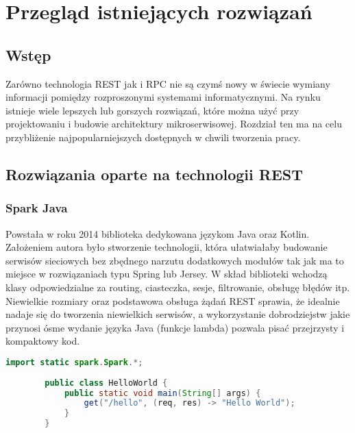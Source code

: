 \chapter{Przegląd istniejących rozwiązań}
\section{Wstęp}
Zarówno technologia REST jak i RPC nie są czymś nowy w świecie wymiany informacji pomiędzy rozproszonymi systemami informatycznymi. Na rynku istnieje wiele lepszych lub gorszych rozwiązań, które można użyć przy projektowaniu i budowie architektury mikroserwisowej. Rozdział ten ma na celu przybliżenie najpopularniejszych dostępnych w chwili tworzenia pracy.
\section{Rozwiązania oparte na technologii REST}
\subsection{Spark Java}
Powstała w roku 2014 biblioteka dedykowana językom Java oraz Kotlin. Założeniem autora było stworzenie technologii, która ułatwiałaby budowanie serwisów sieciowych bez zbędnego narzutu dodatkowych modułów tak jak ma to miejsce w rozwiązaniach typu Spring lub Jersey. W skład biblioteki wchodzą klasy odpowiedzialne za routing, ciasteczka, sesje, filtrowanie, obsługę błędów itp. Niewielkie rozmiary oraz podstawowa obsługa żądań REST sprawia, że idealnie nadaje się do tworzenia niewielkich serwisów, a wykorzystanie dobrodziejstw jakie przynosi ósme wydanie języka Java (funkcje lambda) pozwala pisać przejrzysty i kompaktowy kod.
\begin{lstlisting}[language=Java, caption=Przykład metody zwracającej tekst w Spark Java]
        import static spark.Spark.*;
        
        public class HelloWorld {
            public static void main(String[] args) {
                get("/hello", (req, res) -> "Hello World");
            } 
        }
        \end{lstlisting}
